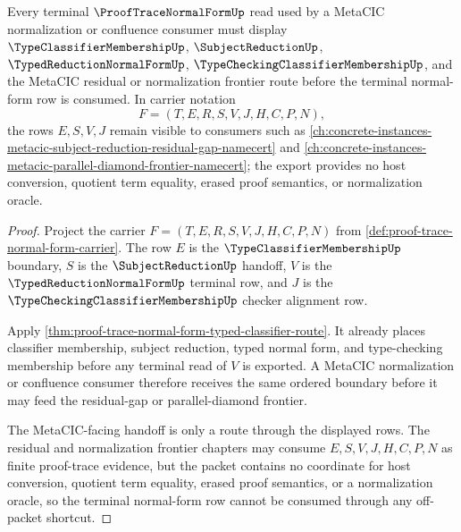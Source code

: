 \begin{theorem}
\label{thm:proof-trace-normal-form-metacic-route}
Every terminal $\ProofTraceNormalFormUp$ read used by a MetaCIC normalization or confluence consumer must display $\TypeClassifierMembershipUp$, $\SubjectReductionUp$, $\TypedReductionNormalFormUp$, $\TypeCheckingClassifierMembershipUp$, and the MetaCIC residual or normalization frontier route before the terminal normal-form row is consumed. In carrier notation
$$
F=(T,E,R,S,V,J,H,C,P,N),
$$
the rows $E,S,V,J$ remain visible to consumers such as \autoref{ch:concrete-instances-metacic-subject-reduction-residual-gap-namecert} and \autoref{ch:concrete-instances-metacic-parallel-diamond-frontier-namecert}; the export provides no host conversion, quotient term equality, erased proof semantics, or normalization oracle.
\end{theorem}
\begin{proof}
Project the carrier $F=(T,E,R,S,V,J,H,C,P,N)$ from \autoref{def:proof-trace-normal-form-carrier}. The row $E$ is the $\TypeClassifierMembershipUp$ boundary, $S$ is the $\SubjectReductionUp$ handoff, $V$ is the $\TypedReductionNormalFormUp$ terminal row, and $J$ is the $\TypeCheckingClassifierMembershipUp$ checker alignment row.

Apply \autoref{thm:proof-trace-normal-form-typed-classifier-route}. It already places classifier membership, subject reduction, typed normal form, and type-checking membership before any terminal read of $V$ is exported. A MetaCIC normalization or confluence consumer therefore receives the same ordered boundary before it may feed the residual-gap or parallel-diamond frontier.

The MetaCIC-facing handoff is only a route through the displayed rows. The residual and normalization frontier chapters may consume $E,S,V,J,H,C,P,N$ as finite proof-trace evidence, but the packet contains no coordinate for host conversion, quotient term equality, erased proof semantics, or a normalization oracle, so the terminal normal-form row cannot be consumed through any off-packet shortcut.
\end{proof}
